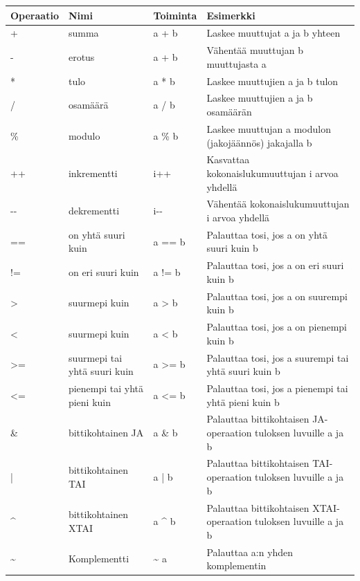 \documentclass[a4paper,justified,notoc]{tufte-book}
\begin{document}
\begin{fullwidth}
\bigskip
\begin{center}
\footnotesize
\begin{tabular}{llll}
\toprule
Operaatio & Nimi & Toiminta & Esimerkki \\
\midrule
+ & summa & a + b & Laskee muuttujat a ja b yhteen \\
\addlinespace
- & erotus & a + b & Vähentää muuttujan b muuttujasta a \\
\addlinespace
* & tulo & a * b & Laskee muuttujien a ja b tulon \\
\addlinespace
/ & osamäärä & a / b & Laskee muuttujien a ja b osamäärän \\
\addlinespace
\% & modulo & a \% b & Laskee muuttujan a modulon (jakojäännös) jakajalla b \\
\addlinespace
++ & inkrementti & i++ & Kasvattaa kokonaislukumuuttujan i arvoa yhdellä \\
\addlinespace
-{}- & dekrementti & i-{}- & Vähentää kokonaislukumuuttujan i arvoa yhdellä \\
\addlinespace
== & on yhtä suuri kuin & a == b & Palauttaa tosi, jos a on yhtä suuri kuin b \\
\addlinespace
!= & on eri suuri kuin & a != b & Palauttaa tosi, jos a on eri suuri kuin b \\
\addlinespace
> & suurmepi kuin & a > b & Palauttaa tosi, jos a on suurempi kuin b \\
\addlinespace
< & suurmepi kuin & a < b & Palauttaa tosi, jos a on pienempi kuin b \\
\addlinespace
>= & suurmepi tai yhtä suuri kuin & a >= b & Palauttaa tosi, jos a suurempi tai yhtä
suuri kuin b \\
<= & pienempi tai yhtä pieni kuin & a <= b & Palauttaa tosi, jos a pienempi tai yhtä
pieni kuin b \\
\addlinespace
\& & bittikohtainen JA & a \& b & Palauttaa bittikohtaisen JA-operaation tuloksen luvuille a ja b
\\
\addlinespace
| & bittikohtainen TAI & a | b & Palauttaa bittikohtaisen TAI-operaation tuloksen luvuille a ja b
\\
\addlinespace
\^{} & bittikohtainen XTAI & a \^{} b & Palauttaa bittikohtaisen XTAI-operaation tuloksen luvuille
a ja b \\
\addlinespace
\~{} & Komplementti & \~{} a & Palauttaa a:n yhden komplementin \\
\bottomrule
\end{tabular}
\end{center}


\end{fullwidth}
\end{document}
